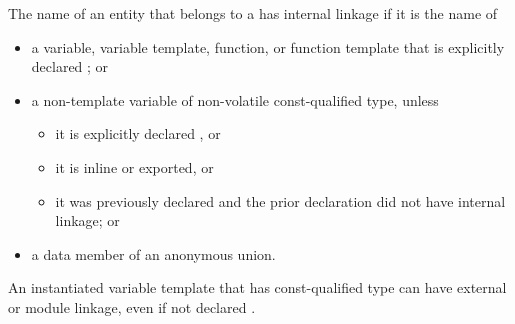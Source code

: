 \pnum
{}%
%
%
%
%
%
The name of an entity
that belongs to a 
has internal linkage if it is the name of
\begin{itemize}
\item
  a variable, variable template, function, or function template that is
  explicitly declared ; or
\item
  a non-template variable of non-volatile const-qualified type, unless
  \begin{itemize}
  \item it is explicitly declared , or
  \item it is inline or exported, or
  \item it was previously declared and the prior declaration did
  not have internal linkage; or
  \end{itemize}
\item
  a data member of an anonymous union.
\end{itemize}
\begin{note}
An instantiated variable template that has const-qualified type
can have external or module linkage, even if not declared .
\end{note}

